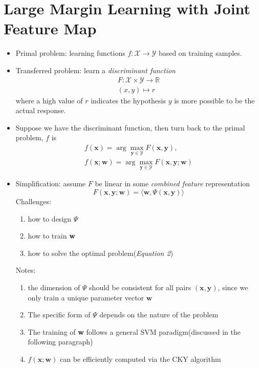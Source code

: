 \documentclass[12pt,a4paper,twoside]{article}
\begin{document}
\section{Large Margin Learning with Joint Feature Map}
\begin{itemize}
\item Primal problem: learning functions $f:\mathcal{X}\rightarrow
\mathcal{Y}$ based on training samples.
\item Transferred problem: learn a \emph{discriminant function}
\begin{eqnarray*}
F:\mathcal{X}\times \mathcal{Y} \rightarrow \mathbb{R}\\
(x,y)\mapsto r
\end{eqnarray*}
where a high value of $r$ indicates the hypothesis $y$ is more
possible to be the actual response.
\item Suppose we have the discriminant function, then turn back
to the primal problem, $f$ is
\begin{eqnarray}
f(\mathbf{x})=\arg\max_{\mathbf{y}\in \mathcal{Y}}F(\mathbf{x,y}),\\
f(\mathbf{x;w})=\arg\max_{\mathbf{y}\in \mathcal{Y}}F(\mathbf{x,y;w})
\end{eqnarray}
\label{eqn1}
\item Simplification: assume $F$ be linear in some \emph{combined feature}
representation
\[
F(\mathbf{x,y;w})=\langle \mathbf{w},\Psi(\mathbf{x,y})\rangle
\]
Challenges:
\begin{enumerate}
\item how to design $\Psi$
\item how to train \textbf{w}
\item how to solve the optimal problem(\emph{Equation 2})
\end{enumerate}
Notes:
\begin{enumerate}
\item the dimension of $\Psi$ should be consistent for all
pairs $\mathbf{(x,y)}$, since we only train a unique parameter
vector $\mathbf{w}$
\item The specific form of $\Psi$ depends on the nature of the problem
\item The training of \textbf{w} follows a general SVM paradigm(discussed
in the following paragraph)
\item $f(\mathbf{x;w})$ can be efficiently computed via the CKY algorithm
\end{enumerate}
\end{itemize}
\end{document}
